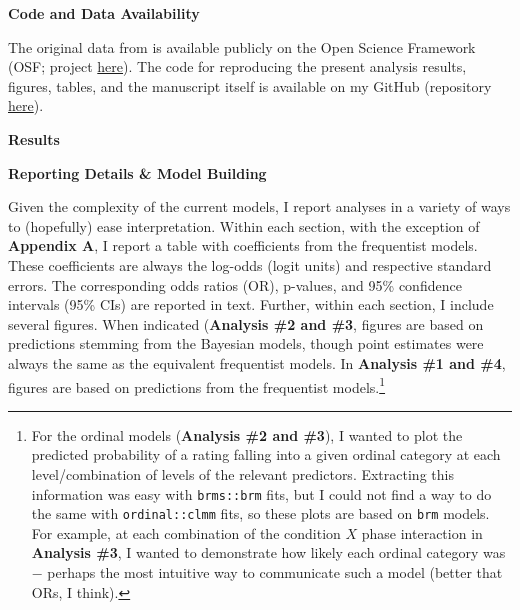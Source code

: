\documentclass[12pt]{article}  %
\begin{document}
\noindent\textbf{Code and Data Availability}

The original data from \textcite{vlasceanu_synchronization_2020} is available publicly on the Open Science Framework (OSF; project \href{https://osf.io/8vjym/}{here}). The code for reproducing the present analysis results, figures, tables, and the manuscript itself is available on my GitHub (repository \href{https://github.com/ggreeley/belief_synch_reanalysis_505/tree/dev}{here}).

\begin{center}
    \textbf{Results} %
\end{center}


\noindent\textbf{Reporting Details \& Model Building}

Given the complexity of the current models, I report analyses in a variety of ways to (hopefully) ease interpretation. Within each section, with the exception of \textbf{Appendix A}, I report a table with coefficients from the frequentist models. These coefficients are always the log-odds (logit units) and respective standard errors. The corresponding odds ratios (OR), p-values, and 95\% confidence intervals (95\% CIs) are reported in text. Further, within each section, I include several figures. When indicated (\textbf{Analysis \#2 and \#3}, figures are based on predictions stemming from the Bayesian models, though point estimates were always the same as the equivalent frequentist models. In \textbf{Analysis \#1 and \#4}, figures are based on predictions from the frequentist models.\footnote{For the ordinal models (\textbf{Analysis \#2 and \#3}), I wanted to plot the predicted probability of a rating falling into a given ordinal category at each level/combination of levels of the relevant predictors. Extracting this information was easy with \verb|brms::brm| fits, but I could not find a way to do the same with \verb|ordinal::clmm| fits, so these plots are based on \verb+brm+ models. For example, at each combination of the condition $X$ phase interaction in \textbf{Analysis \#3}, I wanted to demonstrate how likely each ordinal category was $-$ perhaps the most intuitive way to communicate such a model (better that ORs, I think).}
\end{document}
